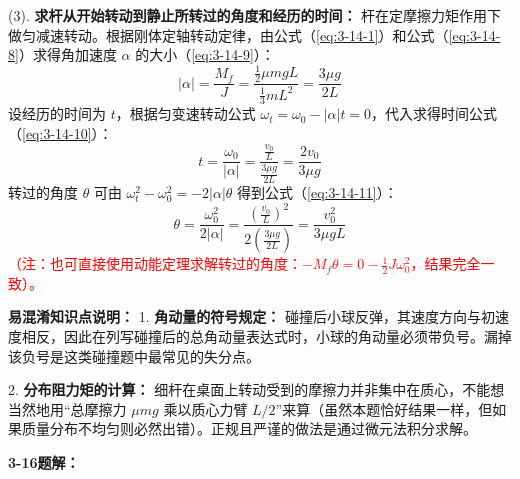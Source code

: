 (3). \textbf{求杆从开始转动到静止所转过的角度和经历的时间：}
杆在定摩擦力矩作用下做匀减速转动。根据刚体定轴转动定律，由公式（\ref{eq:3-14-1}）和公式（\ref{eq:3-14-8}）求得角加速度 $\alpha$ 的大小（\ref{eq:3-14-9}）：
\begin{equation}\label{eq:3-14-9}
	|\alpha| = \frac{M_f}{J} = \frac{\frac{1}{2} \mu m g L}{\frac{1}{3}mL^2} = \frac{3 \mu g}{2 L}
\end{equation}
设经历的时间为 $t$，根据匀变速转动公式 $\omega_t = \omega_0 - |\alpha| t = 0$，代入求得时间公式（\ref{eq:3-14-10}）：
\begin{equation}\label{eq:3-14-10}
	t = \frac{\omega_0}{|\alpha|} = \frac{\frac{v_0}{L}}{\frac{3 \mu g}{2 L}} = \frac{2v_0}{3\mu g}
\end{equation}
转过的角度 $\theta$ 可由 $\omega_t^2 - \omega_0^2 = -2|\alpha|\theta$ 得到公式（\ref{eq:3-14-11}）：
\begin{equation}\label{eq:3-14-11}
	\theta = \frac{\omega_0^2}{2|\alpha|} = \frac{\left(\frac{v_0}{L}\right)^2}{2 \left(\frac{3 \mu g}{2 L}\right)} = \frac{v_0^2}{3 \mu g L}
\end{equation}
\textcolor{red}{（注：也可直接使用动能定理求解转过的角度：$-M_f \theta = 0 - \frac{1}{2}J\omega_0^2$，结果完全一致）。}

\vspace{1em}

\textbf{易混淆知识点说明：}
1. \textbf{角动量的符号规定：} 碰撞后小球反弹，其速度方向与初速度相反，因此在列写碰撞后的总角动量表达式时，小球的角动量必须带负号。漏掉该负号是这类碰撞题中最常见的失分点。

2. \textbf{分布阻力矩的计算：} 细杆在桌面上转动受到的摩擦力并非集中在质心，不能想当然地用“总摩擦力 $\mu mg$ 乘以质心力臂 $L/2$”来算（虽然本题恰好结果一样，但如果质量分布不均匀则必然出错）。正规且严谨的做法是通过微元法积分求解。

\vspace{2em}

\textbf{3-16题解：}
\setcounter{equation}{0}
\renewcommand{\theHequation}{3-16.\arabic{equation}}

